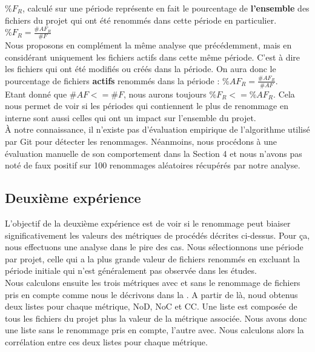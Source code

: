 $\%F_{R}$, calculé sur une période représente en fait le pourcentage de \textbf{l'ensemble} des fichiers du projet qui ont été renommés dans cette période en particulier. $\%F_{R} = \frac{\#AF_{R}}{\#F}$ \\

Nous proposons en complément la même analyse que précédemment, mais en considérant uniquement les fichiers actifs dans cette même période. C'est à dire les fichiers qui ont été modifiés ou créés dans la période. On aura donc le pourcentage de fichiers \textbf{actifs} renommés dans la période : 
$\%AF_{R} = \frac{\#AF_{R}}{\#AF}$. \\
Etant donné que ${\#AF} <= {\#F}$, nous aurons toujours $\%F_{R} <= \%AF_{R}$. Cela nous permet de voir si les périodes qui contiennent le plus de renommage en interne sont aussi celles qui ont un impact sur l'ensemble du projet.\\

À notre connaissance, il n'existe pas d'évaluation empirique de l'algorithme utilisé par Git pour détecter les renommages. Néanmoins, nous procédons à une évaluation manuelle de son comportement dans la Section 4 et nous n'avons pas noté de faux positif sur 100 renommages aléatoires récupérés par notre analyse.\\

\subsection{Deuxième expérience}

L'objectif de la deuxième expérience est de voir si le renommage peut biaiser significativement les valeurs des métriques de procédés décrites ci-dessus. Pour ça, nous effectuons une analyse dans le pire des cas. Nous sélectionnons une période par projet, celle qui a la plus grande valeur de fichiers renommés en excluant la période initiale qui n'est généralement pas observée dans les études.\\ 

Nous calculons ensuite les trois métriques avec et sans le renommage de fichiers pris en compte comme nous le décrivons dans la . A partir de là, noud obtenus deux listes pour chaque métrique, NoD, NoC et CC. Une liste est composée de tous les fichiers du projet plus la valeur de la métrique associée. Nous avons donc une liste sans le renommage pris en compte, l'autre avec. Nous calculons alors la corrélation entre ces deux listes pour chaque métrique.\\ 

